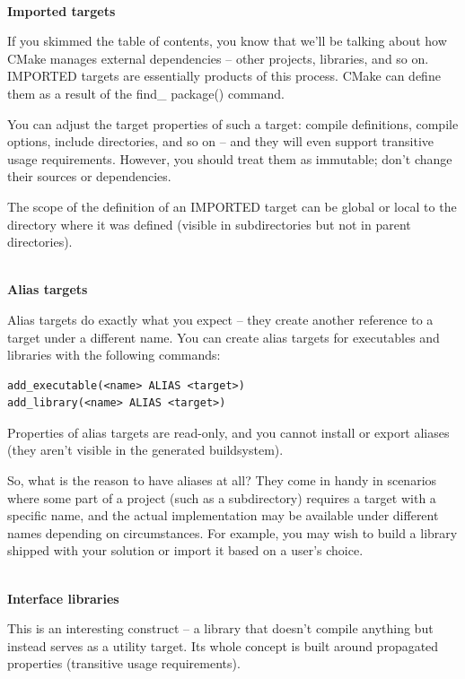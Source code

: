 \hspace*{\fill} \\ %
\noindent
\textbf{Imported targets}

If you skimmed the table of contents, you know that we'll be talking about how CMake manages external dependencies – other projects, libraries, and so on. IMPORTED targets are essentially products of this process. CMake can define them as a result of the find\_ package() command.

You can adjust the target properties of such a target: compile definitions, compile options, include directories, and so on – and they will even support transitive usage requirements. However, you should treat them as immutable; don't change their sources or dependencies.

The scope of the definition of an IMPORTED target can be global or local to the directory where it was defined (visible in subdirectories but not in parent directories).

\hspace*{\fill} \\ %
\noindent
\textbf{Alias targets}

Alias targets do exactly what you expect – they create another reference to a target under a different name. You can create alias targets for executables and libraries with the following commands:

\begin{lstlisting}[style=styleCMake]
add_executable(<name> ALIAS <target>)
add_library(<name> ALIAS <target>)
\end{lstlisting}

Properties of alias targets are read-only, and you cannot install or export aliases (they aren't visible in the generated buildsystem).

So, what is the reason to have aliases at all? They come in handy in scenarios where some part of a project (such as a subdirectory) requires a target with a specific name, and the actual implementation may be available under different names depending on circumstances. For example, you may wish to build a library shipped with your solution or import it based on a user's choice.

\hspace*{\fill} \\ %
\noindent
\textbf{Interface libraries}

This is an interesting construct – a library that doesn't compile anything but instead serves as a utility target. Its whole concept is built around propagated properties (transitive usage requirements).


